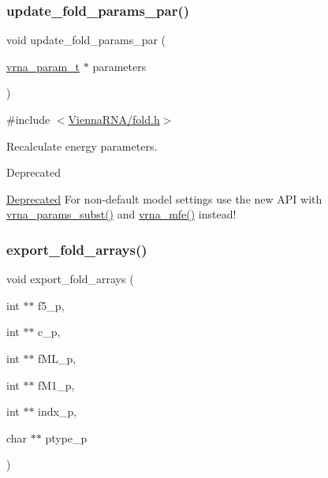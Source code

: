 \subsubsection{\texorpdfstring{update\+\_\+fold\+\_\+params\+\_\+par()}{update\_fold\_params\_par()}}
{\footnotesize\ttfamily void update\+\_\+fold\+\_\+params\+\_\+par (\begin{DoxyParamCaption}\item[{\hyperlink{group__energy__parameters_ga8a69ca7d787e4fd6079914f5343a1f35}{vrna\+\_\+param\+\_\+t} $\ast$}]{parameters }\end{DoxyParamCaption})}



{\ttfamily \#include $<$\hyperlink{fold_8h}{Vienna\+R\+N\+A/fold.\+h}$>$}



Recalculate energy parameters. 

\begin{DoxyRefDesc}{Deprecated}
\item[\hyperlink{deprecated__deprecated000071}{Deprecated}]For non-\/default model settings use the new A\+PI with \hyperlink{group__energy__parameters_ga5d1909208f7ea3baa98b75afaa1f62ca}{vrna\+\_\+params\+\_\+subst()} and \hyperlink{group__mfe__global_gabd3b147371ccf25c577f88bbbaf159fd}{vrna\+\_\+mfe()} instead!\end{DoxyRefDesc}
\mbox{\label{group__mfe__global__deprecated_ga99641b8dbb40891da5490d3cc271e607}} 
\subsubsection{\texorpdfstring{export\+\_\+fold\+\_\+arrays()}{export\_fold\_arrays()}}
{\footnotesize\ttfamily void export\+\_\+fold\+\_\+arrays (\begin{DoxyParamCaption}\item[{int $\ast$$\ast$}]{f5\+\_\+p,  }\item[{int $\ast$$\ast$}]{c\+\_\+p,  }\item[{int $\ast$$\ast$}]{f\+M\+L\+\_\+p,  }\item[{int $\ast$$\ast$}]{f\+M1\+\_\+p,  }\item[{int $\ast$$\ast$}]{indx\+\_\+p,  }\item[{char $\ast$$\ast$}]{ptype\+\_\+p }\end{DoxyParamCaption})}




